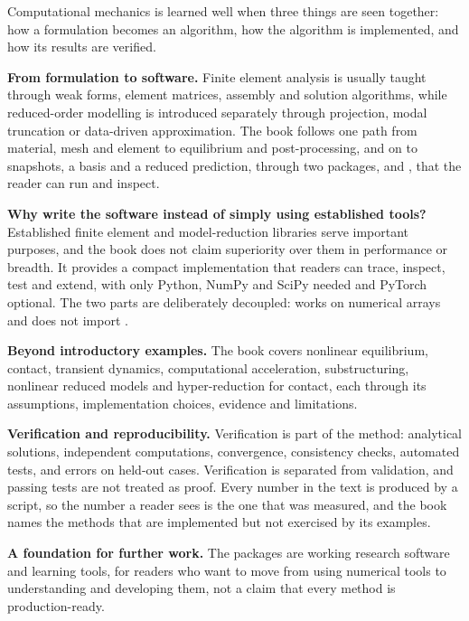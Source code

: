 \newpage\thispagestyle{hl}
\begin{hlquote}Computational mechanics is learned well when three things are seen together: how a formulation becomes an algorithm, how the algorithm is implemented, and how its results are verified.\end{hlquote}
\vspace{4pt}\noindent\textbf{From formulation to software.} Finite element analysis is usually taught through weak forms, element matrices, assembly and solution algorithms, while reduced-order modelling is introduced separately through projection, modal truncation or data-driven approximation. The book follows one path from material, mesh and element to equilibrium and post-processing, and on to snapshots, a basis and a reduced prediction, through two packages, \fea{} and \rom{}, that the reader can run and inspect.

\vspace{4pt}\noindent\textbf{Why write the software instead of simply using established tools?} Established finite element and model-reduction libraries serve important purposes, and the book does not claim superiority over them in performance or breadth. It provides a compact implementation that readers can trace, inspect, test and extend, with only Python, NumPy and SciPy needed and PyTorch optional. The two parts are deliberately decoupled: \rom{} works on numerical arrays and does not import \fea{}.

\vspace{4pt}\noindent\textbf{Beyond introductory examples.} The book covers nonlinear equilibrium, contact, transient dynamics, computational acceleration, substructuring, nonlinear reduced models and hyper-reduction for contact, each through its assumptions, implementation choices, evidence and limitations.

\vspace{4pt}\noindent\textbf{Verification and reproducibility.} Verification is part of the method: analytical solutions, independent computations, convergence, consistency checks, automated tests, and errors on held-out cases. Verification is separated from validation, and passing tests are not treated as proof. Every number in the text is produced by a script, so the number a reader sees is the one that was measured, and the book names the methods that are implemented but not exercised by its examples.

\vspace{4pt}\noindent\textbf{A foundation for further work.} The packages are working research software and learning tools, for readers who want to move from using numerical tools to understanding and developing them, not a claim that every method is production-ready.
